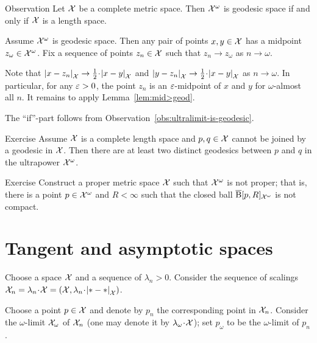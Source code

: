 \begin{thm}{Observation}\label{obs:ultrapower-is-geodesic}
Let $\mathcal{X}$ be a complete metric space. 
Then $\mathcal{X}^\omega$ is geodesic space if and only if $\mathcal{X}$ is a length space.
\end{thm}

Assume $\mathcal{X}^\omega$ is geodesic space.
Then any pair of points $x,y\in \mathcal{X}$ has a midpoint $z_\omega\in\mathcal{X}^\omega$.
Fix a sequence of points $z_n\in  \mathcal{X}$ such that $z_n\to z_\omega$ as $n\to \omega$.

Note that 
$\dist{x}{z_n}{\spc{X}}\to \tfrac12\cdot \dist{x}{y}{\spc{X}}$
and 
$\dist{y}{z_n}{\spc{X}}\to \tfrac12\cdot \dist{x}{y}{\spc{X}}$
as 
$n\to\omega$.
In particular, for any $\varepsilon>0$, the point $z_n$ is an $\varepsilon$-midpoint of $x$ and $y$ for $\omega$-almost all $n$.
It remains to apply Lemma~\ref{lem:mid>geod}.

The ``if''-part follows from Observation~\ref{obs:ultralimit-is-geodesic}.
\qeds

\begin{thm}{Exercise}\label{ex:two-geodesics-in-ultrapower}
Assume $\mathcal{X}$ is a complete length space 
and $p,q\in\mathcal{X}$ cannot be joined by a geodesic in $\mathcal{X}$.  
Then there are at least two distinct geodesics between $p$ and $q$ 
in the ultrapower $\mathcal{X}^\omega$.
\end{thm}

\begin{thm}{Exercise}
 Construct a proper metric space $\mathcal{X}$ such that $\mathcal{X}^\omega$ is not proper; that is, there is a point $p\in \mathcal{X}^\omega$ and $R<\infty$ such that the closed ball $\overline{\mathrm{B}}{}[p,R]_{\mathcal{X}^\omega}$ is not compact.
\end{thm}

\section{Tangent and asymptotic spaces}

Choose a space $\mathcal{X}$ and a sequence of $\lambda_n>0$.
Consider the sequence of scalings $\spc{X}_n=\lambda_n\cdot\spc{X}=(\spc{X},\lambda_n\cdot\dist{*}{*}{\spc{X}})$.

Choose a point $p\in \mathcal{X}$ and denote by $p_n$ the corresponding point in $\mathcal{X}_n$.
Consider the $\omega$-limit $\mathcal{X}_\omega$ of $\mathcal{X}_n$ (one may denote it by $\lambda_\omega\cdot \spc{X}$);
set $p_\omega$ to be the $\omega$-limit of $p_n$.

